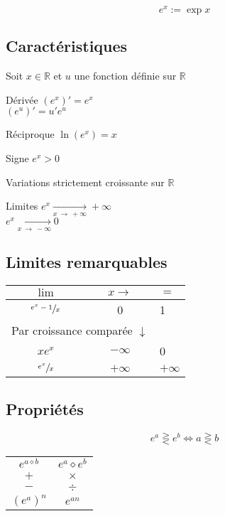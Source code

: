 \documentclass{article}
\newcommand{\R}{\mathds{R}}
\newcommand{\twoColsNB}[1]{\multicolumn{2}{c}{#1}}
\newcommand{\goesto}[2]{\xrightarrow[#1\:\to\:#2]{}}
\newcommand{\placeholder}{\diamond}
\newenvironment{descriptiona}{\begin{description}[leftmargin=!,labelwidth=\widthof{\bfseries The longest label}]}{\end{description}}
\begin{document}
\[e^x := \exp{x}\]

\subsection{Caractéristiques}

Soit $x \in \R$ et $u$ une fonction définie sur $\R$

\begin{descriptiona}
\item[Dérivée] $(e^x)' = e^x$\\$(e^u)' = u'e^u$
\item[Réciproque] $\ln(e^x) = x$
\item[Signe] $e^x > 0$
\item[Variations] strictement croissante sur $\R$
\item[Limites] $e^x \goesto{x}{+\infty} +\infty $\\$ e^x \goesto{x}{-\infty} 0$
\end{descriptiona}

\subsection{Limites remarquables}
\begin{table}[h]
    \centering
    \begin{tabular}{cc|l}
        $\lim$ & $x\to$ & $=$ \\\hline\hline
        $\sfrac{e^x-1}{x}$ & 0 & 1 \\\hline
        \twoColsNB{Par croissance comparée $\downarrow$} & \\\hline
        $xe^x$ & $-\infty$ & 0 \\\hline
        $\sfrac{e^x}{x}$ & $+\infty$ & $+\infty$
    \end{tabular}
\end{table}

\label{proprietes_exp}
\subsection{Propriétés}

\[e^a \gtreqless e^b \iff a \gtreqless b\]

\begin{table}[h!]
    \centering
    \begin{tabular}{c|c}
        $e^{a\placeholder b}$ & $e^ a \placeholder e^ b $ \\
        $+$ & $\times$ \\
        $-$ & $\div$ \\\hline
        $(e^a)^n$ &  $e^{an}$ \\
    \end{tabular}
\end{table}
\end{document}

